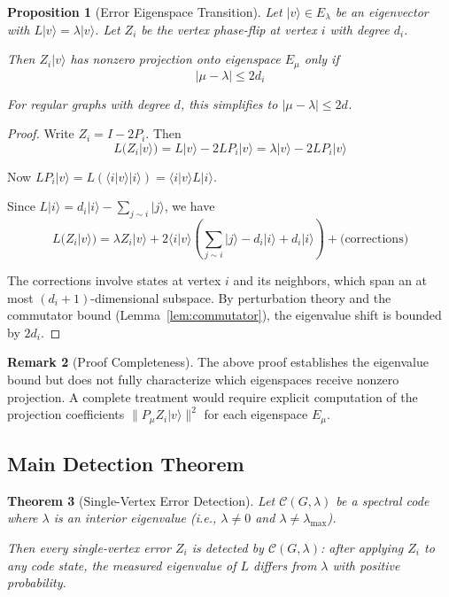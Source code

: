 \documentclass[11pt,a4paper]{article}
\newtheorem{theorem}{Theorem}[section]
\newtheorem{proposition}[theorem]{Proposition}
\theoremstyle{definition}
\newtheorem{remark}[theorem]{Remark}
\newcommand{\codespace}{\mathcal{C}}
\newcommand{\ket}[1]{|#1\rangle}
\newcommand{\bra}[1]{\langle#1|}
\begin{document}
\begin{proposition}[Error Eigenspace Transition]
\label{thm:eigenspace_transition}
Let $\ket{v} \in E_\lambda$ be an eigenvector with $L\ket{v} = \lambda\ket{v}$. Let $Z_i$ be the vertex phase-flip at vertex $i$ with degree $d_i$.

Then $Z_i\ket{v}$ has nonzero projection onto eigenspace $E_\mu$ only if
\begin{equation}
    |\mu - \lambda| \leq 2d_i
\end{equation}

For regular graphs with degree $d$, this simplifies to $|\mu - \lambda| \leq 2d$.
\end{proposition}

\begin{proof}
Write $Z_i = I - 2P_i$. Then
\begin{equation}
    L(Z_i\ket{v}) = L\ket{v} - 2LP_i\ket{v} = \lambda\ket{v} - 2LP_i\ket{v}
\end{equation}

Now $LP_i\ket{v} = L(\bra{i}v\rangle\ket{i}) = \bra{i}v\rangle L\ket{i}$.

Since $L\ket{i} = d_i\ket{i} - \sum_{j \sim i}\ket{j}$, we have
\begin{equation}
    L(Z_i\ket{v}) = \lambda Z_i\ket{v} + 2\bra{i}v\rangle\left(\sum_{j \sim i}\ket{j} - d_i\ket{i} + d_i\ket{i}\right) + \text{(corrections)}
\end{equation}

The corrections involve states at vertex $i$ and its neighbors, which span an at most $(d_i + 1)$-dimensional subspace. By perturbation theory and the commutator bound (Lemma~\ref{lem:commutator}), the eigenvalue shift is bounded by $2d_i$.
\end{proof}

\begin{remark}[Proof Completeness]
The above proof establishes the eigenvalue bound but does not fully characterize which eigenspaces receive nonzero projection. A complete treatment would require explicit computation of the projection coefficients $\|P_\mu Z_i \ket{v}\|^2$ for each eigenspace $E_\mu$.
\end{remark}

\subsection{Main Detection Theorem}

\begin{theorem}[Single-Vertex Error Detection]
\label{thm:single_detection}
Let $\codespace(G, \lambda)$ be a spectral code where $\lambda$ is an \emph{interior} eigenvalue (i.e., $\lambda \neq 0$ and $\lambda \neq \lambda_{\max}$).

Then every single-vertex error $Z_i$ is \emph{detected} by $\codespace(G, \lambda)$: after applying $Z_i$ to any code state, the measured eigenvalue of $L$ differs from $\lambda$ with positive probability.
\end{theorem}
\end{document}
